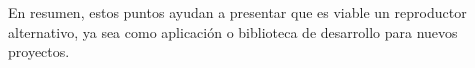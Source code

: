 En resumen, estos puntos ayudan a presentar que es viable un reproductor alternativo, ya sea como aplicación o biblioteca de desarrollo para nuevos proyectos. \\




	





